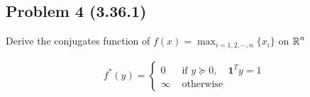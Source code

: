 \documentclass[en,hazy,blue,12pt,device = pad]{elegantnote}
\begin{document}
\subsection*{Problem 4 (3.36.1)}
Derive the conjugates function of \(f(x) = \max_{i = 1,2,\cdots ,n} \{x_i\}\) on \(\operatorname{\mathbb R}^n\)
\begin{tcolorbox}
    \sol

    \begin{align*}
        f^*(y)= \begin{cases}0 & \text { if } y \succeq 0, \quad \mathbf{1}^T y=1 \\ \infty & \text { otherwise }\end{cases}
    \end{align*}
\end{tcolorbox}
\end{document}
